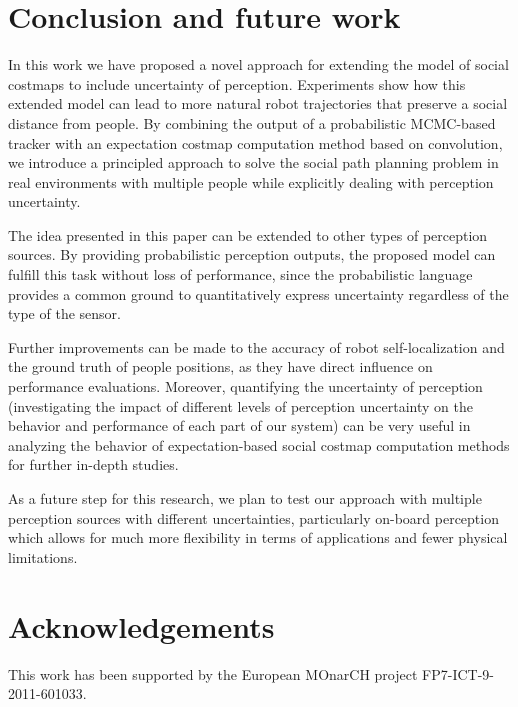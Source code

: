 \section{Conclusion and future work}
\label{sec:conclusion}

In this work we have proposed a novel approach for extending the model of social costmaps to include uncertainty of perception. Experiments show how this extended model can lead to more natural robot trajectories that preserve a social distance from people. By combining the output of a probabilistic MCMC-based tracker with an expectation costmap computation method based on convolution, we introduce a principled approach to solve the social path planning problem in real environments with multiple people while explicitly dealing with perception uncertainty. 



The idea presented in this paper can be extended to other types of perception sources. By providing probabilistic perception outputs, the proposed model can fulfill this task without loss of performance, since the probabilistic language provides a common ground to quantitatively express uncertainty regardless of the type of the sensor. 


Further improvements can be made to the accuracy of robot self-localization and the ground truth of people positions, as they have direct influence on performance evaluations. Moreover, quantifying the uncertainty of perception (investigating the impact of different levels of perception uncertainty on the behavior and performance of each part of our system) can be very useful in analyzing the behavior of expectation-based social costmap computation methods for further in-depth studies.


As a future step for this research, we plan to test our approach with multiple perception sources with different uncertainties, particularly on-board perception which allows for much more flexibility in terms of applications and fewer physical limitations.%






\section*{Acknowledgements}

This work has been supported by the European MOnarCH project FP7-ICT-9-2011-601033. 


